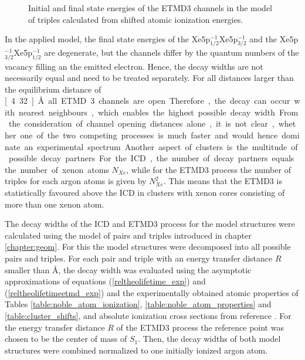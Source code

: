 \begin{figure}[htb]
 \centering
 
 \caption{Initial and final state energies of the \ac{ETMD}3 channels
          in the model of triples calculated from shifted atomic ionization
          energies.}
 \label{figure:ArXe_energy_etmd_curves}
\end{figure}

In the applied model, the final state energies of the
Xe5p$_{1/2}^{-1}$Xe5p$_{3/2}^{-1}$ and
the Xe5p$_{3/2}^{-1}$Xe5p$_{1/2}^{-1}$ are degenerate, but the channels
differ by the quantum
numbers of the vacancy filling an the emitted electron. Hence, the decay
widths are not necessarily equal and need to be treated separately.
For all distances larger than the equilibrium distance of \unit[4.32]{\AA}
all \ac{ETMD}3 channels are open. Therefore, the decay can occur with
nearest neighbours, which enables the highest possible decay width.

From the consideration of channel opening distances alone, it is not clear, whether
one of the two competing processes is much faster and would hence dominate
an experimental spectrum. Another aspect of clusters is the multitude of
possible decay partners. For the \ac{ICD}, the number of decay partners equals
the number of xenon atoms $N_{Xe}$, while for the \ac{ETMD}3 process the number
of triples for each argon atoms is given by $N_{Xe}^2$. This means that
the \ac{ETMD}3 is statistically favoured above the \ac{ICD} in clusters with
xenon cores consisting of more than one xenon atom.

The decay widths of the \ac{ICD} and \ac{ETMD}3 process for the model
structures were calculated using the model of pairs and triples introduced in
chapter \ref{chapter:geom}. For this the model structures were decomposed
into all possible pairs and triples. For each pair and triple with an energy
transfer distance $R$ smaller than \unit[11]{\AA}, the decay width was evaluated
using
the asymptotic approximations of equations
(\ref{reltheolifetime_exp}) and (\ref{reltheolifetimeetmd_exp}) and the
experimentally obtained atomic properties of Tables
\ref{table:noble_atom_ionization}, \ref{table:noble_atom_properties} and
\ref{table:cluster_shifts}, and absolute ionization cross sections from reference
\cite{West78}. For the energy transfer distance $R$ of the \ac{ETMD}3 process
the reference point was chosen to be the center of mass of
$S_1$. 
Then, the decay widths of both model structures were combined normalized
to one initially ionized argon atom.

